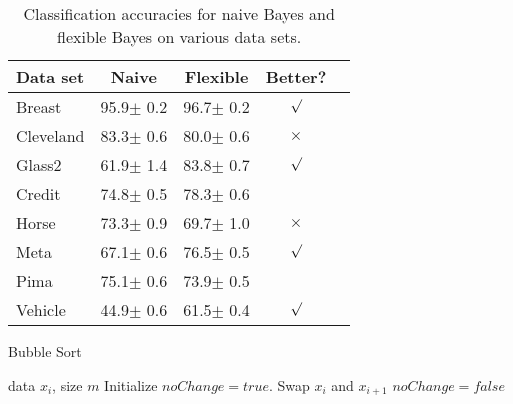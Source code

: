 \begin{table}[t]
    \caption{Classification accuracies for naive Bayes and flexible
    Bayes on various data sets.}
    \label{sample-table}
    \vskip 0.15in
    \begin{center}
        \begin{small}
            \begin{sc}
            \begin{tabular}{lcccr}
                \toprule
                Data set & Naive & Flexible & Better? \\
                \midrule
                Breast    & 95.9$\pm$ 0.2& 96.7$\pm$ 0.2& $\surd$ \\
                Cleveland & 83.3$\pm$ 0.6& 80.0$\pm$ 0.6& $\times$\\
                Glass2    & 61.9$\pm$ 1.4& 83.8$\pm$ 0.7& $\surd$ \\
                Credit    & 74.8$\pm$ 0.5& 78.3$\pm$ 0.6&         \\
                Horse     & 73.3$\pm$ 0.9& 69.7$\pm$ 1.0& $\times$\\
                Meta      & 67.1$\pm$ 0.6& 76.5$\pm$ 0.5& $\surd$ \\
                Pima      & 75.1$\pm$ 0.6& 73.9$\pm$ 0.5&         \\
                Vehicle   & 44.9$\pm$ 0.6& 61.5$\pm$ 0.4& $\surd$ \\
                \bottomrule
            \end{tabular}
            \end{sc}
        \end{small}
    \end{center}
    \vskip -0.1in
\end{table}

\begin{algorithm}[tb]
    \caption{Bubble Sort}
    \label{alg:example}
    \begin{algorithmic}
        data $x_i$, size $m$
       \REPEAT
       \STATE Initialize $noChange = true$.
       \STATE Swap $x_i$ and $x_{i+1}$
       \STATE $noChange = false$
       \ENDIF
       \ENDFOR
    \end{algorithmic}
\end{algorithm}

